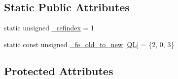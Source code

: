 \subsection*{Static Public Attributes}
\begin{DoxyCompactItemize}
\item 
static unsigned \mbox{\hyperlink{classfemus_1_1elem__type_ac090b500b9fe133dec615fae6545b3a8}{\+\_\+refindex}} = 1
\item 
static const unsigned \mbox{\hyperlink{classfemus_1_1elem__type_a6cba788f2fbdef1b91a1492908794f8d}{\+\_\+fe\+\_\+old\+\_\+to\+\_\+new}} \mbox{[}\mbox{\hyperlink{_f_e_type_enum_8hpp_aca285339f9cf24489fdc0af5b51a5fde}{QL}}\mbox{]} = \{2, 0, 3\}
\end{DoxyCompactItemize}
\subsection*{Protected Attributes}
